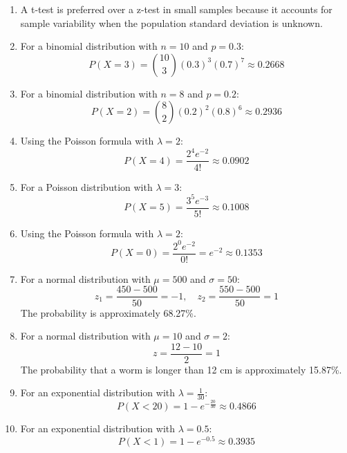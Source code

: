 \documentclass[11pt]{article}
\begin{document}
\begin{enumerate}
    \item A t-test is preferred over a z-test in small samples because it accounts for sample variability when the population standard deviation is unknown.

    \item For a binomial distribution with $n = 10$ and $p = 0.3$:
    \[
    P(X = 3) = \binom{10}{3} (0.3)^3 (0.7)^{7} \approx 0.2668
    \]

    \item For a binomial distribution with $n = 8$ and $p = 0.2$:
    \[
    P(X = 2) = \binom{8}{2} (0.2)^2 (0.8)^{6} \approx 0.2936
    \]

    \item Using the Poisson formula with $\lambda = 2$:
    \[
    P(X = 4) = \frac{2^4 e^{-2}}{4!} \approx 0.0902
    \]

    \item For a Poisson distribution with $\lambda = 3$:
    \[
    P(X = 5) = \frac{3^5 e^{-3}}{5!} \approx 0.1008
    \]

    \item Using the Poisson formula with $\lambda = 2$:
    \[
    P(X = 0) = \frac{2^0 e^{-2}}{0!} = e^{-2} \approx 0.1353
    \]

    \item For a normal distribution with $\mu = 500$ and $\sigma = 50$:
    \[
    z_1 = \frac{450 - 500}{50} = -1, \quad z_2 = \frac{550 - 500}{50} = 1
    \]
    The probability is approximately 68.27\%.

    \item For a normal distribution with $\mu = 10$ and $\sigma = 2$:
    \[
    z = \frac{12 - 10}{2} = 1
    \]
    The probability that a worm is longer than 12 cm is approximately 15.87\%.

    \item For an exponential distribution with $\lambda = \frac{1}{30}$:
    \[
    P(X < 20) = 1 - e^{-\frac{20}{30}} \approx 0.4866
    \]

    \item For an exponential distribution with $\lambda = 0.5$:
    \[
    P(X < 1) = 1 - e^{-0.5} \approx 0.3935
    \]

\end{enumerate}
\end{document}
